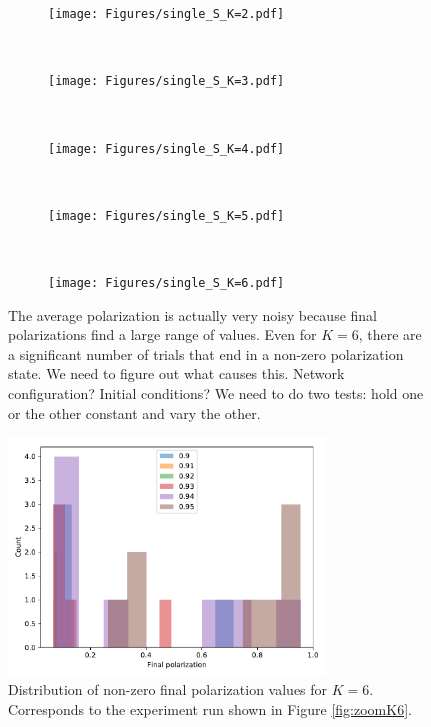 \documentclass[11pt,letterpaper]{article}
\begin{document}
\begin{figure}
  \centering
  \begin{subfigure}[t]{\textwidth}
    \centering
    \texttt{[image: Figures/single\_S\_K=2.pdf]}
  \end{subfigure} \\
  \begin{subfigure}[t]{0.49\textwidth}
      \centering
      \texttt{[image: Figures/single\_S\_K=3.pdf]}
  \end{subfigure}
  ~
  \begin{subfigure}[t]{0.49\textwidth}
      \centering
      \texttt{[image: Figures/single\_S\_K=4.pdf]}
  \end{subfigure} \\
  \begin{subfigure}[t]{0.49\textwidth}
      \centering
      \texttt{[image: Figures/single\_S\_K=5.pdf]}
  \end{subfigure}
  ~
  \begin{subfigure}[t]{0.49\textwidth}
      \centering
      \texttt{[image: Figures/single\_S\_K=6.pdf]}
  \end{subfigure}
  \caption{The average polarization is actually very noisy because 
    final polarizations find a large range of values. Even for $K=6$, there
    are a significant number of trials that end in a non-zero polarization
    state. We need to figure out what causes this. Network configuration?
    Initial conditions? We need to do two tests: hold one or the other 
    constant and vary the other.
  }
\end{figure}

\begin{figure}[t!]
  \centering
    \includegraphics[width=0.75\textwidth]{Figures/p_v_s_k6_histograms.pdf}
  \caption{Distribution of non-zero final polarization values for $K=6$.
    Corresponds to the experiment run shown in Figure \ref{fig:zoomK6}.
  }
  \label{fig:K6-histograms}
\end{figure}
\end{document}
